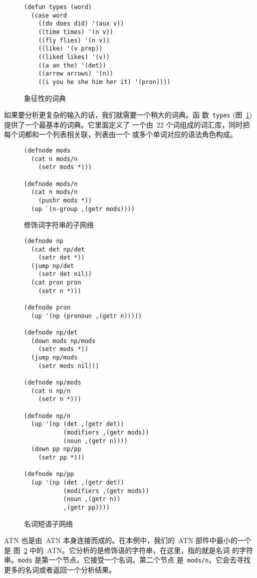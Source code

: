 \begin{figure}
\begin{lstlisting}
(defun types (word)
  (case word
    ((do does did) '(aux v))
    ((time times) '(n v))
    ((fly flies) '(n v))
    ((like) '(v prep))
    ((liked likes) '(v))
    ((a an the) '(det))
    ((arrow arrows) '(n))
    ((i you he she him her it) '(pron))))
\end{lstlisting}
  \caption{象征性的词典}
  \label{fig:nominal_dictionary}
\end{figure}

如果要分析更复杂的输入的话，我们就需要一个稍大的词典。函
数~\texttt{types} (图~\ref{fig:nominal_dictionary}) 提供了一个最基本的词典。它里面定义了
一个由~22 个词组成的词汇库，同时把每个词都和一个列表相关联，列表由一个
或多个单词对应的语法角色构成。


\begin{figure}
\begin{lstlisting}
(defnode mods
  (cat n mods/n
    (setr mods *)))

(defnode mods/n
  (cat n mods/n
    (pushr mods *))
  (up `(n-group ,(getr mods))))
\end{lstlisting}
  \caption{修饰词字符串的子网络}
  \label{fig:sub-network_for_strings_of_modifiers}
\end{figure}

\begin{figure}
\begin{lstlisting}
(defnode np
  (cat det np/det
    (setr det *))
  (jump np/det
    (setr det nil))
  (cat pron pron
    (setr n *)))

(defnode pron
  (up '(np (pronoun ,(getr n)))))

(defnode np/det
  (down mods np/mods
    (setr mods *))
  (jump np/mods
    (setr mods nil)))

(defnode np/mods
  (cat n np/n
    (setr n *)))

(defnode np/n
  (up '(np (det ,(getr det))
           (modifiers ,(getr mods))
           (noun ,(getr n))))
  (down pp np/pp
    (setr pp *)))

(defnode np/pp
  (up '(np (det ,(getr det))
           (modifiers ,(getr mods))
           (noun ,(getr n))
           ,(getr pp))))
\end{lstlisting}
  \caption{名词短语子网络}
  \label{fig:noun_phrase_sub-network}
\end{figure}

\textsc{ATN} 也是由~\textsc{ATN} 本身连接而成的。在本例中，我们的~\textsc{ATN} 部件中最小的一个是
图~\ref{fig:sub-network_for_strings_of_modifiers} 中的~\textsc{ATN}。它分析的是修饰语的字符串，在这里，指的就是名词
的字符串。\texttt{mods} 是第一个节点，它接受一个名词。第二个节点
是~\texttt{mods/n}，它会去寻找更多的名词或者返回一个分析结果。

